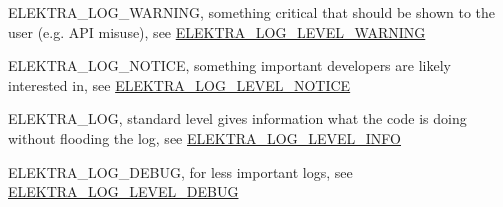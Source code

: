 \begin{DoxyItemize}
\item {\ttfamily E\+L\+E\+K\+T\+R\+A\+\_\+\+L\+O\+G\+\_\+\+W\+A\+R\+N\+I\+NG}, something critical that should be shown to the user (e.\+g. A\+PI misuse), see \hyperlink{kdblogger_8h_a4096a2ccd61c6f5ad60e9015fd1bbb4ba0524fff5c46e0cf07287c473c46cc8e2}{E\+L\+E\+K\+T\+R\+A\+\_\+\+L\+O\+G\+\_\+\+L\+E\+V\+E\+L\+\_\+\+W\+A\+R\+N\+I\+NG}
\item {\ttfamily E\+L\+E\+K\+T\+R\+A\+\_\+\+L\+O\+G\+\_\+\+N\+O\+T\+I\+CE}, something important developers are likely interested in, see \hyperlink{kdblogger_8h_a4096a2ccd61c6f5ad60e9015fd1bbb4ba329fc1e04c797ab8e54a137b21f41baf}{E\+L\+E\+K\+T\+R\+A\+\_\+\+L\+O\+G\+\_\+\+L\+E\+V\+E\+L\+\_\+\+N\+O\+T\+I\+CE}
\item {\ttfamily E\+L\+E\+K\+T\+R\+A\+\_\+\+L\+OG}, standard level gives information what the code is doing without flooding the log, see \hyperlink{kdblogger_8h_a4096a2ccd61c6f5ad60e9015fd1bbb4ba01618746c91d9d1090f599f604b9b832}{E\+L\+E\+K\+T\+R\+A\+\_\+\+L\+O\+G\+\_\+\+L\+E\+V\+E\+L\+\_\+\+I\+N\+FO}
\item {\ttfamily E\+L\+E\+K\+T\+R\+A\+\_\+\+L\+O\+G\+\_\+\+D\+E\+B\+UG}, for less important logs, see \hyperlink{kdblogger_8h_a4096a2ccd61c6f5ad60e9015fd1bbb4ba24c7a4c44a8b99b978dc99806d083386}{E\+L\+E\+K\+T\+R\+A\+\_\+\+L\+O\+G\+\_\+\+L\+E\+V\+E\+L\+\_\+\+D\+E\+B\+UG} 
\end{DoxyItemize}